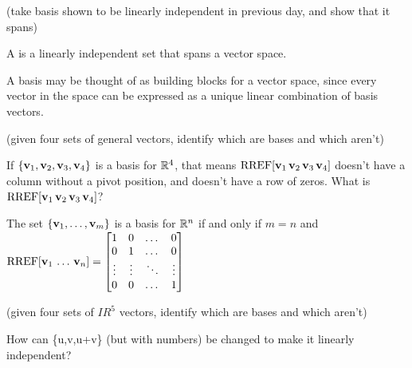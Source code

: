 
\begin{applicationActivities}{2}{13}

\begin{activity}{10}
  (take basis shown to be linearly independent in previous day, and
  show that it spans)
\end{activity}

\begin{definition}
  A  is a linearly independent set that spans a vector space.
\end{definition}

\begin{observation}
  A basis may be thought of as building blocks for a vector space, since
  every vector in the space can be expressed as a unique linear combination
  of basis vectors.
\end{observation}

\begin{activity}{10}
  (given four sets of general vectors, identify which are bases and which aren't)
\end{activity}

\begin{activity}{10}
  If \(\{\mathbf v_1,\mathbf v_2,\mathbf v_3,\mathbf v_4\}\) is a basis for
  \(\mathbb{R}^4\), that means \(\operatorname{RREF}[\mathbf v_1\,\mathbf v_2\,\mathbf v_3\,\mathbf v_4]\)
  doesn't have a column without a pivot position, and doesn't have a
  row of zeros. What is \(\operatorname{RREF}[\mathbf v_1\,\mathbf v_2\,\mathbf v_3\,\mathbf v_4]\)?
\end{activity}

\begin{fact}
  The set \(\{\mathbf v_1,\dots,\mathbf v_m\}\) is a basis for \(\mathbb{R}^n\) if and
  only if \(m=n\) and
  \(\operatorname{RREF}[\mathbf v_1\,\dots\,\mathbf v_n]=
  \begin{bmatrix}
    1&0&\dots&0\\
    0&1&\dots&0\\
    \vdots&\vdots&\ddots&\vdots\\
    0&0&\dots&1
  \end{bmatrix}
  \)
\end{fact}

\begin{activity}{10}
  (given four sets of \(IR^5\) vectors, identify which are bases and which
  aren't)
\end{activity}

\begin{activity}{10}
  How can \{u,v,u+v\} (but with numbers) be changed to make it
  linearly independent?
\end{activity}

\end{applicationActivities}
